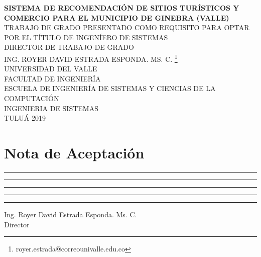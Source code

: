 \documentclass[12pt,letterpaper,openany]{book}
\begin{document}
\begin{titlepage}
\begin{center}
\textbf{SISTEMA DE RECOMENDACIÓN DE SITIOS TURÍSTICOS Y COMERCIO PARA EL MUNICIPIO DE GINEBRA (VALLE)} \\

\vspace*{1.3in}
TRABAJO DE GRADO PRESENTADO COMO REQUISITO PARA OPTAR POR EL TÍTULO DE INGENÍERO DE SISTEMAS \\

\vspace*{1.3in}
DIRECTOR DE TRABAJO DE GRADO \\
ING. ROYER DAVID ESTRADA ESPONDA. MS. C. \footnote{royer.estrada@correounivalle.edu.co}\\

\vspace*{1.3in}
UNIVERSIDAD DEL VALLE\\
FACULTAD DE INGENIERÍA\\
ESCUELA DE INGENIERÍA DE SISTEMAS Y CIENCIAS DE LA COMPUTACIÓN\\
INGENIERIA DE SISTEMAS\\
TULUÁ
2019

\end{center}
\thispagestyle{empty}
\end{titlepage}

\chapter*{Nota de Aceptación}
\vspace*{1in}
\begin{center}
\rule{90mm}{0.1mm} \newline
\rule{90mm}{0.1mm} \newline
\rule{90mm}{0.1mm} \newline
\rule{90mm}{0.1mm} \newline
\end{center}

\vspace*{1.5in}
\rule{90mm}{0.1mm} \newline
Ing. Royer David Estrada Esponda. Ms. C. \\
Director
\end{document}
